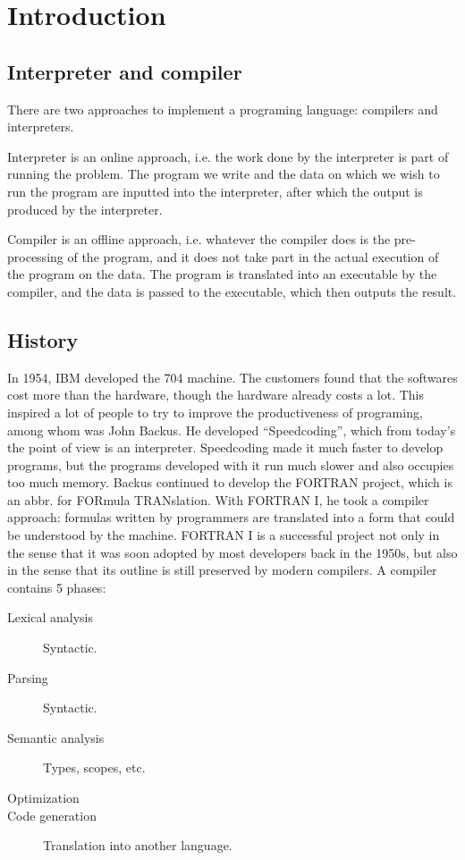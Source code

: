 \ifx\PREAMBLE\undefined


\fi
\chapter{Introduction}
\section{Interpreter and compiler}
There are two approaches to implement a programing language: compilers and interpreters.

Interpreter is an online approach, i.e. the work done by the interpreter is part of running the problem. The program we write and the data on which we wish to run the program are inputted into the interpreter, after which the output is produced by the interpreter. 

Compiler is an offline approach, i.e. whatever the compiler does is the pre-processing of the program, and it does not take part in the actual execution of the program on the data. The program is translated into an executable by the compiler, and the data is passed to the executable, which then outputs the result.
\section{History}
In 1954, IBM developed the 704 machine. The customers found that the softwares cost more than the hardware, though the hardware already costs a lot. This inspired a lot of people to try to improve the productiveness of programing, among whom was John Backus. He developed ``Speedcoding'', which from today's the point of view is an interpreter. Speedcoding made it much faster to develop programs, but the programs developed with it run much slower and also occupies too much memory. Backus continued to develop the FORTRAN project, which is an abbr. for FORmula TRANslation. With FORTRAN I, he took a compiler approach: formulas written by programmers are translated into a form that could be understood by the machine. FORTRAN I is a successful project not only in the sense that it was soon adopted by most developers back in the 1950s, but also in the sense that its outline is still preserved by modern compilers. A compiler contains 5 phases:
\begin{description}
\item [Lexical analysis] Syntactic.
\item [Parsing] Syntactic.
\item [Semantic analysis] Types, scopes, etc.
\item [Optimization]
\item [Code generation] Translation into another language.
\end{description}
\ifx\PREAMBLE\undefined

\fi
